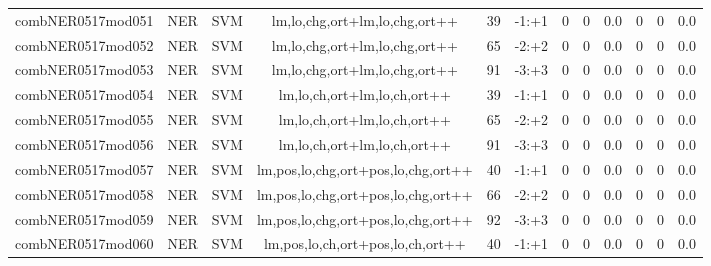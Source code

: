 \documentclass[a4paper]{article}
\begin{document}
\begin{landscape}
\begin{center}
\begin{tabular}{ |c|c|c|c|c|c|c|c|c|c|c|c|}
 
 	
 	\small{ combNER0517mod051 } & \small{ NER} & \small{  SVM }  & lm,lo,chg,ort+lm,lo,chg,ort++  &  39 &  \small{  -1:+1 }  &  0 & 0 & 0.0  &  0 & 0 & 0.0 \\
 	

 
 	
 	\small{ combNER0517mod052 } & \small{ NER} & \small{  SVM }  & lm,lo,chg,ort+lm,lo,chg,ort++  &  65 &  \small{  -2:+2 }  &  0 & 0 & 0.0  &  0 & 0 & 0.0 \\
 	

 
 	
 	\small{ combNER0517mod053 } & \small{ NER} & \small{  SVM }  & lm,lo,chg,ort+lm,lo,chg,ort++  &  91 &  \small{  -3:+3 }  &  0 & 0 & 0.0  &  0 & 0 & 0.0 \\
 	

 
 	
 	\small{ combNER0517mod054 } & \small{ NER} & \small{  SVM }  & lm,lo,ch,ort+lm,lo,ch,ort++  &  39 &  \small{  -1:+1 }  &  0 & 0 & 0.0  &  0 & 0 & 0.0 \\
 	

 
 	
 	\small{ combNER0517mod055 } & \small{ NER} & \small{  SVM }  & lm,lo,ch,ort+lm,lo,ch,ort++  &  65 &  \small{  -2:+2 }  &  0 & 0 & 0.0  &  0 & 0 & 0.0 \\
 	

 
 	
 	\small{ combNER0517mod056 } & \small{ NER} & \small{  SVM }  & lm,lo,ch,ort+lm,lo,ch,ort++  &  91 &  \small{  -3:+3 }  &  0 & 0 & 0.0  &  0 & 0 & 0.0 \\
 	

 
 	
 	\small{ combNER0517mod057 } & \small{ NER} & \small{  SVM }  & lm,pos,lo,chg,ort+pos,lo,chg,ort++  &  40 &  \small{  -1:+1 }  &  0 & 0 & 0.0  &  0 & 0 & 0.0 \\
 	

 
 	
 	\small{ combNER0517mod058 } & \small{ NER} & \small{  SVM }  & lm,pos,lo,chg,ort+pos,lo,chg,ort++  &  66 &  \small{  -2:+2 }  &  0 & 0 & 0.0  &  0 & 0 & 0.0 \\
 	

 
 	
 	\small{ combNER0517mod059 } & \small{ NER} & \small{  SVM }  & lm,pos,lo,chg,ort+pos,lo,chg,ort++  &  92 &  \small{  -3:+3 }  &  0 & 0 & 0.0  &  0 & 0 & 0.0 \\
 	

 
 	
 	\small{ combNER0517mod060 } & \small{ NER} & \small{  SVM }  & lm,pos,lo,ch,ort+pos,lo,ch,ort++  &  40 &  \small{  -1:+1 }  &  0 & 0 & 0.0  &  0 & 0 & 0.0 \\
 	


\end{tabular}
\end{center}
\end{landscape}
\end{document}
